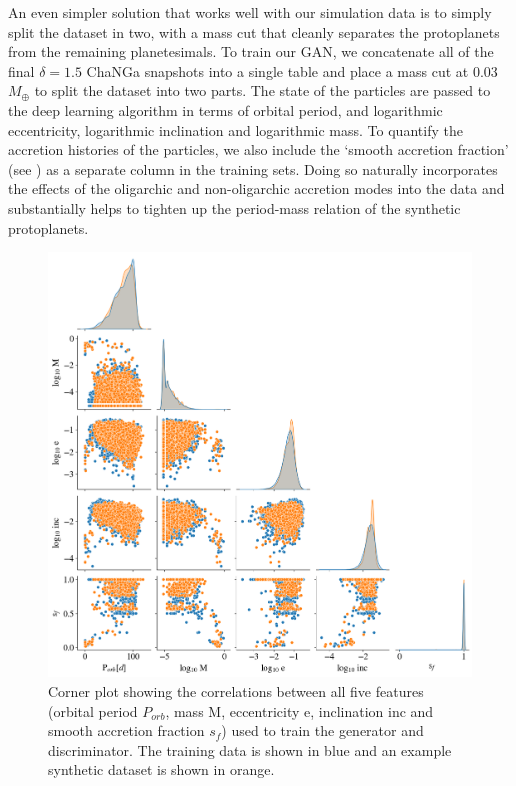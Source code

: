 An even simpler solution that works well with our simulation data is to simply split the dataset in two, with a mass cut that cleanly separates the protoplanets from the remaining planetesimals. To train our GAN, we concatenate all of the final $\delta = 1.5$ {\sc ChaNGa} snapshots into a single table and place a mass cut at 0.03 $M_{\oplus}$ to split the dataset into two parts. The state of the particles are passed to the deep learning algorithm in terms of orbital period, and logarithmic eccentricity, logarithmic inclination and logarithmic mass. To quantify the accretion histories of the particles, we also include the `smooth accretion fraction' (see \cite{wallace23}) as a separate column in the training sets. Doing so naturally incorporates the effects of the oligarchic and non-oligarchic accretion modes into the data and substantially helps to tighten up the period-mass relation of the synthetic protoplanets.

\begin{figure}
\begin{center}
    \includegraphics[width=\textwidth]{figures/stip/real_syn_corner.png}
    \caption{Corner plot showing the correlations between all five features (orbital period $P_{orb}$, mass M, eccentricity e, inclination inc and smooth accretion fraction $s_{f}$) used to train the generator and discriminator. The training data is shown in blue and an example synthetic dataset is shown in orange.\label{fig:real_syn_corner}}
\end{center}
\end{figure}

